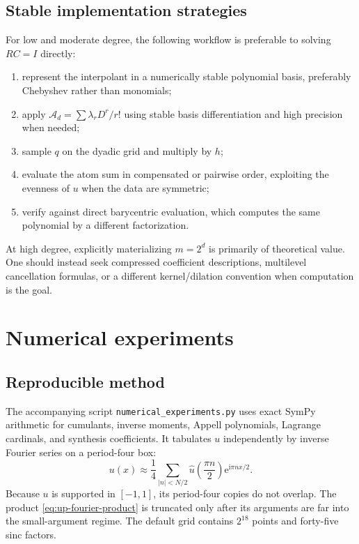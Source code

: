 \documentclass[11pt,oneside]{book}
\theoremstyle{definition}
\theoremstyle{remark}
\newcommand{\Aop}{\mathcal A}
\newcommand{\e}{\mathrm e}
\newcommand{\iu}{\mathrm i}
\newcommand{\RepoPath}[1]{\texttt{#1}}
\begin{document}
\section{Stable implementation strategies}
For low and moderate degree, the following workflow is preferable to solving \(RC=I\) directly:
\begin{enumerate}
\item represent the interpolant in a numerically stable polynomial basis, preferably Chebyshev rather than monomials;
\item apply \(\Aop_d=\sum\lambda_rD^r/r!\) using stable basis differentiation and high precision when needed;
\item sample \(q\) on the dyadic grid and multiply by \(h\);
\item evaluate the atom sum in compensated or pairwise order, exploiting the evenness of \(u\) when the data are symmetric;
\item verify against direct barycentric evaluation, which computes the same polynomial by a different factorization.
\end{enumerate}
At high degree, explicitly materializing \(m=2^d\) is primarily of theoretical value.  One should instead seek compressed coefficient descriptions, multilevel cancellation formulas, or a different kernel/dilation convention when computation is the goal.

\chapter{Numerical experiments}
\label{ch:numerics}

\section{Reproducible method}
The accompanying script \RepoPath{numerical\_experiments.py} uses exact SymPy arithmetic for cumulants, inverse moments, Appell polynomials, Lagrange cardinals, and synthesis coefficients.  It tabulates \(u\) independently by inverse Fourier series on a period-four box:
\begin{equation}
 u(x)\approx\frac1{4}\sum_{|n|<N/2}
 \widehat u\!\left(\frac{\pi n}{2}\right)
 \e^{\iu\pi nx/2}.
 \label{eq:fft-tabulation}
\end{equation}
Because \(u\) is supported in \([-1,1]\), its period-four copies do not overlap.  The product \cref{eq:up-fourier-product} is truncated only after its arguments are far into the small-argument regime.  The default grid contains \(2^{18}\) points and forty-five sinc factors.
\end{document}
